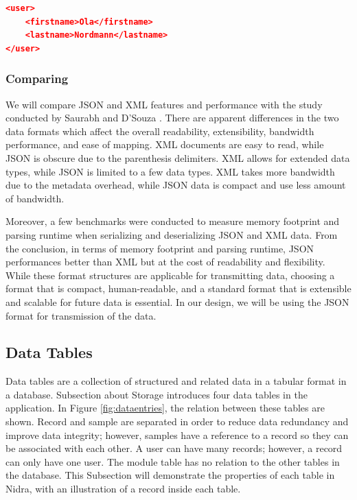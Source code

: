 \begin{lstlisting}[language=json, caption={My Caption}, captionpos=b]
<user>
    <firstname>Ola</firstname>
    <lastname>Nordmann</lastname>
</user>
\end{lstlisting}

\subsubsection{Comparing}
We will compare JSON and XML features and performance with the study conducted by Saurabh and D’Souza \cite{jsonvxml}. There are apparent differences in the two data formats which affect the overall readability, extensibility, bandwidth performance, and ease of mapping. XML documents are easy to read, while JSON is obscure due to the parenthesis delimiters. XML allows for extended data types, while JSON is limited to a few data types. XML takes more bandwidth due to the metadata overhead, while JSON data is compact and use less amount of bandwidth.

Moreover, a few benchmarks were conducted to measure memory footprint and parsing runtime when serializing and deserializing JSON and XML data. From the conclusion,  in terms of memory footprint and parsing runtime, JSON performances better than XML but at the cost of readability and flexibility. While these format structures are applicable for transmitting data, choosing a format that is compact, human-readable, and a standard format that is extensible and scalable for future data is essential. In our design, we will be using the JSON format for transmission of the data.

\subsection{Data Tables}
Data tables are a collection of structured and related data in a tabular format in a database. Subsection about Storage introduces four data tables in the application.  In Figure \ref{fig:dataentries}, the relation between these tables are shown. Record and sample are separated in order to reduce data redundancy and improve data integrity; however, samples have a reference to a record so they can be associated with each other. A user can have many records; however, a record can only have one user. The module table has no relation to the other tables in the database. This Subsection will demonstrate the properties of each table in Nidra, with an illustration of a record inside each table.

